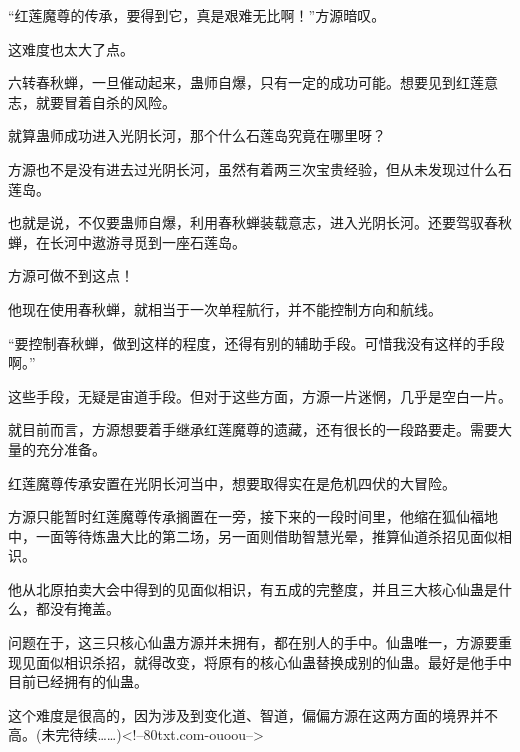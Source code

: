 \begin{this_body}
“红莲魔尊的传承，要得到它，真是艰难无比啊！”方源暗叹。

这难度也太大了点。

六转春秋蝉，一旦催动起来，蛊师自爆，只有一定的成功可能。想要见到红莲意志，就要冒着自杀的风险。

就算蛊师成功进入光阴长河，那个什么石莲岛究竟在哪里呀？

方源也不是没有进去过光阴长河，虽然有着两三次宝贵经验，但从未发现过什么石莲岛。

也就是说，不仅要蛊师自爆，利用春秋蝉装载意志，进入光阴长河。还要驾驭春秋蝉，在长河中遨游寻觅到一座石莲岛。

方源可做不到这点！

他现在使用春秋蝉，就相当于一次单程航行，并不能控制方向和航线。

“要控制春秋蝉，做到这样的程度，还得有别的辅助手段。可惜我没有这样的手段啊。”

这些手段，无疑是宙道手段。但对于这些方面，方源一片迷惘，几乎是空白一片。

就目前而言，方源想要着手继承红莲魔尊的遗藏，还有很长的一段路要走。需要大量的充分准备。

红莲魔尊传承安置在光阴长河当中，想要取得实在是危机四伏的大冒险。

方源只能暂时红莲魔尊传承搁置在一旁，接下来的一段时间里，他缩在狐仙福地中，一面等待炼蛊大比的第二场，另一面则借助智慧光晕，推算仙道杀招见面似相识。

他从北原拍卖大会中得到的见面似相识，有五成的完整度，并且三大核心仙蛊是什么，都没有掩盖。

问题在于，这三只核心仙蛊方源并未拥有，都在别人的手中。仙蛊唯一，方源要重现见面似相识杀招，就得改变，将原有的核心仙蛊替换成别的仙蛊。最好是他手中目前已经拥有的仙蛊。

这个难度是很高的，因为涉及到变化道、智道，偏偏方源在这两方面的境界并不高。(未完待续……)<!--80txt.com-ouoou-->

\end{this_body}

